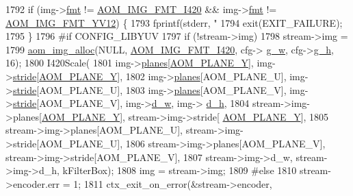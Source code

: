 \begin{DoxyCodeInclude}
{{{{{{{{{{{{{{{{{{{{{{{{{{{{{{{{{1792     \textcolor{keywordflow}{if} (img->\hyperlink{structaom__image_a6c64b1ab918d80d52eb8f5d6d957e825}{fmt} != \hyperlink{aom__image_8h_a930317c04b4bd0a660bb5e744055523cabd778a3d697463e89d12a1117f417b60}{AOM\_IMG\_FMT\_I420} && img->\hyperlink{structaom__image_a6c64b1ab918d80d52eb8f5d6d957e825}{fmt} != 
      \hyperlink{aom__image_8h_a930317c04b4bd0a660bb5e744055523cad28244100a2754409f285b77a3db90a0}{AOM\_IMG\_FMT\_YV12}) \{
1793       fprintf(stderr, \textcolor{stringliteral}{"%
1794       exit(EXIT\_FAILURE);
1795     \}
1796 \textcolor{preprocessor}{#if CONFIG\_LIBYUV}
1797     \textcolor{keywordflow}{if} (!stream->img)
1798       stream->img =
1799           \hyperlink{aom__image_8h_a570db29fbd122951235a08fe9375f6bb}{aom\_img\_alloc}(NULL, \hyperlink{aom__image_8h_a930317c04b4bd0a660bb5e744055523cabd778a3d697463e89d12a1117f417b60}{AOM\_IMG\_FMT\_I420}, cfg->
      \hyperlink{structaom__codec__enc__cfg_a80cb459c5ef3c7e1516f617c4c9d6eab}{g\_w}, cfg->\hyperlink{structaom__codec__enc__cfg_a37b0f57b63bec8d133df8901d4407ee6}{g\_h}, 16);
1800     I420Scale(
1801         img->\hyperlink{structaom__image_ac54dbc5237ca2914f9ec30105dfbe302}{planes}[\hyperlink{aom__image_8h_a2ad22076006b15cf809edcaa33f6d339}{AOM\_PLANE\_Y}], img->\hyperlink{structaom__image_a6dc693d7dbc9eb06c0cdde307ca58372}{stride}[\hyperlink{aom__image_8h_a2ad22076006b15cf809edcaa33f6d339}{AOM\_PLANE\_Y}],
1802         img->\hyperlink{structaom__image_ac54dbc5237ca2914f9ec30105dfbe302}{planes}[AOM\_PLANE\_U], img->\hyperlink{structaom__image_a6dc693d7dbc9eb06c0cdde307ca58372}{stride}[AOM\_PLANE\_U],
1803         img->\hyperlink{structaom__image_ac54dbc5237ca2914f9ec30105dfbe302}{planes}[AOM\_PLANE\_V], img->\hyperlink{structaom__image_a6dc693d7dbc9eb06c0cdde307ca58372}{stride}[AOM\_PLANE\_V], img->\hyperlink{structaom__image_a89f80b1f58d608b9d2080635f4359034}{d\_w}, img->
      \hyperlink{structaom__image_ab986419a1f0fff93a2dc505f47194988}{d\_h},
1804         stream->img->planes[\hyperlink{aom__image_8h_a2ad22076006b15cf809edcaa33f6d339}{AOM\_PLANE\_Y}], stream->img->stride[
      \hyperlink{aom__image_8h_a2ad22076006b15cf809edcaa33f6d339}{AOM\_PLANE\_Y}],
1805         stream->img->planes[AOM\_PLANE\_U], stream->img->stride[AOM\_PLANE\_U],
1806         stream->img->planes[AOM\_PLANE\_V], stream->img->stride[AOM\_PLANE\_V],
1807         stream->img->d\_w, stream->img->d\_h, kFilterBox);
1808     img = stream->img;
1809 \textcolor{preprocessor}{#else}
1810     stream->encoder.err = 1;
1811     ctx\_exit\_on\_error(&stream->encoder,
}}}}}}}}}}}}}}}}}}}}}}}}}}}}}}}}}}
\end{DoxyCodeInclude}
